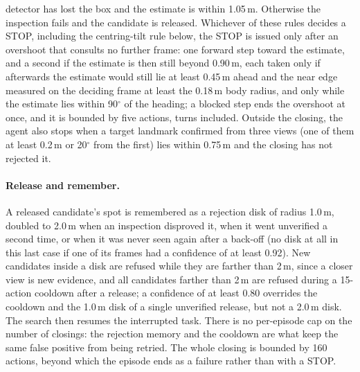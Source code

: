 \documentclass[10pt]{article}
\begin{document}
detector has lost the box and the estimate is within 1.05\,m. Otherwise the inspection fails and the candidate is
released. Whichever of these rules decides a STOP, including the centring-tilt rule below, the STOP is issued only
after an overshoot that consults no further frame: one forward step toward the estimate, and a second if the estimate
is then still beyond 0.90\,m, each taken only if afterwards the estimate would still lie at least 0.45\,m ahead and the
near edge measured on the deciding frame at least the 0.18\,m body radius, and only while the estimate lies within
90$^\circ$ of the heading; a blocked step ends the overshoot at once, and it is bounded by five actions, turns
included. Outside the closing, the agent also stops when a target landmark confirmed from three
views (one of them at least 0.2\,m or 20$^\circ$ from the first) lies within 0.75\,m and the closing has not rejected
it.

\paragraph{Release and remember.}
A released candidate's spot is remembered as a rejection disk of radius 1.0\,m, doubled to 2.0\,m when an inspection
disproved it, when it went unverified a second time, or when it was never seen again after a back-off (no disk at all
in this last case if one of its frames had a confidence of at least 0.92). New candidates
inside a disk are refused while they are farther than 2\,m, since a closer view is new evidence, and all candidates
farther than 2\,m are refused during a 15-action cooldown after a release; a confidence of at least 0.80 overrides the
cooldown and the 1.0\,m disk of a single unverified release, but not a 2.0\,m disk. The search then resumes the
interrupted task. There is no per-episode cap on the number of closings: the rejection memory and the cooldown are
what keep the same false positive from being retried. The whole closing is bounded by 160 actions, beyond which the
episode ends as a failure rather than with a STOP.
\end{document}

